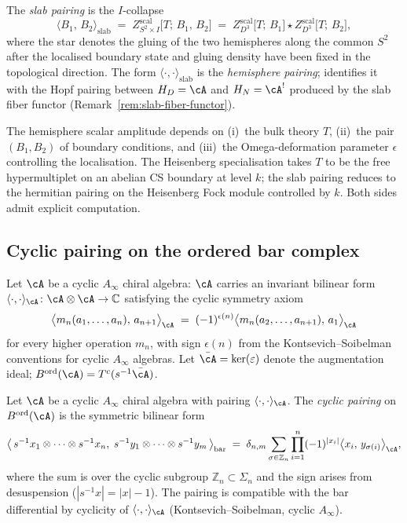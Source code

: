 The \emph{slab pairing} is the $I$-collapse
\[
 \bigl\langle B_1,\, B_2\bigr\rangle_{\mathrm{slab}}
 \;=\;
 Z_{S^2\times I}^{\mathrm{scal}}\bigl[T;\, B_1,\, B_2\bigr]
 \;=\;
 Z_{D^3}^{\mathrm{scal}}\bigl[T;\, B_1\bigr]\star
 Z_{D^3}^{\mathrm{scal}}\bigl[T;\, B_2\bigr],
\]
where the star denotes the gluing of the two hemispheres
along the common $S^2$ after the localised boundary state and
gluing density have been fixed in the topological direction. The
form $\langle\cdot,\cdot\rangle_{\mathrm{slab}}$ is the
\emph{hemisphere pairing}; \cite{Dimofte25} identifies it
with the Hopf pairing between $H_D = \cA$ and $H_N = \cA^!$
produced by the slab fiber functor
(Remark~\ref{rem:slab-fiber-functor}).

\begin{remark}
\label{rem:hemisphere-three-inputs}
The hemisphere scalar amplitude depends on (i)~the bulk theory $T$,
(ii)~the pair $(B_1,B_2)$ of boundary conditions, and (iii)~the
Omega-deformation parameter $\epsilon$ controlling the
localisation. The Heisenberg specialisation takes $T$ to be the free
hypermultiplet on an abelian CS boundary at level $k$; the slab pairing
reduces to the hermitian pairing on the Heisenberg Fock module
controlled by $k$. Both sides admit explicit computation.
\end{remark}

\subsection{Cyclic pairing on the ordered bar complex}
\label{subsec:cyclic-pairing-bar}

Let $\cA$ be a cyclic $A_\infty$ chiral algebra: $\cA$ carries
an invariant bilinear form
$\langle\cdot,\cdot\rangle_\cA\colon \cA\otimes\cA \to \mathbb C$
satisfying the cyclic symmetry axiom
\[
 \bigl\langle m_n(a_1,\ldots,a_n),\, a_{n+1}\bigr\rangle_\cA
 \;=\;
 (-1)^{\epsilon(n)}
 \bigl\langle m_n(a_2,\ldots,a_{n+1}),\, a_1\bigr\rangle_\cA
\]
for every higher operation $m_n$, with sign
$\epsilon(n)$ from the Kontsevich--Soibelman conventions for
cyclic $A_\infty$ algebras. Let $\bar\cA = \ker(\varepsilon)$
denote the augmentation ideal;
$B^{\mathrm{ord}}(\cA) = T^c(s^{-1}\bar\cA)$.

\begin{definition}
\label{def:cyclic-pairing-bar}
Let $\cA$ be a cyclic $A_\infty$ chiral algebra with pairing
$\langle\cdot,\cdot\rangle_\cA$. The \emph{cyclic pairing} on
$B^{\mathrm{ord}}(\cA)$ is the symmetric bilinear form
\[
 \bigl\langle\,
 s^{-1}x_1\otimes\cdots\otimes s^{-1}x_n,\;
 s^{-1}y_1\otimes\cdots\otimes s^{-1}y_m
 \,\bigr\rangle_{\mathrm{bar}}
 \;=\;
 \delta_{n,m}\sum_{\sigma\in \mathbb Z_n}
 \prod_{i=1}^n
 (-1)^{|x_i|}
 \bigl\langle x_i,\, y_{\sigma(i)}\bigr\rangle_\cA ,
\]
where the sum is over the cyclic subgroup $\mathbb Z_n \subset
\Sigma_n$ and the sign arises from desuspension
($|s^{-1}x|=|x|-1$). The pairing is compatible with the
bar differential by cyclicity of $\langle\cdot,\cdot\rangle_\cA$
(Kontsevich--Soibelman, cyclic $A_\infty$).
\end{definition}

